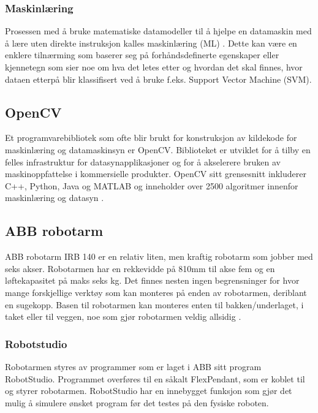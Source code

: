 \documentclass[conference]{IEEEtran}
\begin{document}
        \subsubsection{Maskinlæring}
            Prosessen med å bruke matematiske datamodeller til å hjelpe en datamaskin med å lære uten direkte instruksjon kalles maskinlæring (ML) \cite{teori:ML}. 
            Dette kan være en enklere tilnærming som baserer seg på forhåndsdefinerte egenskaper eller kjennetegn som sier noe om hva det letes etter 
            og hvordan det skal finnes, hvor dataen etterpå blir klassifisert ved å bruke f.eks. Support Vector Machine (SVM).

    \subsection{OpenCV}
    Et programvarebibliotek som ofte blir brukt for konstruksjon av kildekode for maskinlæring og datamaskinsyn er OpenCV.  Biblioteket er utviklet for å tilby en felles infrastruktur for datasynapplikasjoner og for å akselerere bruken av maskinoppfattelse i kommersielle produkter. OpenCV sitt grensesnitt inkluderer C++, Python, Java og MATLAB og inneholder over 2500 algoritmer innenfor maskinlæring og datasyn \cite{teori:OpenCV}. 

    \subsection{ABB robotarm}
        ABB robotarm IRB 140 er en relativ liten, men kraftig robotarm som jobber med seks akser. Robotarmen har en rekkevidde på 810mm til 
        akse fem og en løftekapasitet på maks seks kg. Det finnes nesten ingen begrensninger for hvor mange forskjellige verktøy som kan monteres 
        på enden av robotarmen, deriblant en sugekopp. Basen til robotarmen kan monteres enten til bakken/underlaget, i taket eller til veggen, 
        noe som gjør robotarmen veldig allsidig \cite{teori:ABB}. 

    \subsubsection{Robotstudio}
        Robotarmen styres av programmer som er laget i ABB sitt program RobotStudio. Programmet overføres til en såkalt FlexPendant, som er 
        koblet til og styrer robotarmen. RobotStudio har en innebygget funksjon som gjør det mulig å simulere ønsket program før det testes 
        på den fysiske roboten.
\end{document}
